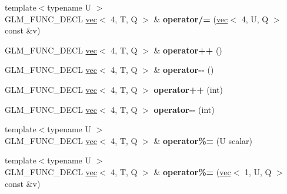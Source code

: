\begin{DoxyCompactItemize}
\item 
\mbox{\label{structglm_1_1vec_3_014_00_01T_00_01Q_01_4_aba90aef1a5d08c44f2ca6be9684bf1cd}} 
{\footnotesize template$<$typename U $>$ }\\G\+L\+M\+\_\+\+F\+U\+N\+C\+\_\+\+D\+E\+CL \hyperlink{structglm_1_1vec}{vec}$<$ 4, T, Q $>$ \& {\bfseries operator/=} (\hyperlink{structglm_1_1vec}{vec}$<$ 4, U, Q $>$ const \&v)
\item 
\mbox{\label{structglm_1_1vec_3_014_00_01T_00_01Q_01_4_a8729def59c3f8b14075332c8603dd5c7}} 
G\+L\+M\+\_\+\+F\+U\+N\+C\+\_\+\+D\+E\+CL \hyperlink{structglm_1_1vec}{vec}$<$ 4, T, Q $>$ \& {\bfseries operator++} ()
\item 
\mbox{\label{structglm_1_1vec_3_014_00_01T_00_01Q_01_4_a1aa18c4fcac90cabb4f8cb2e467d4d9f}} 
G\+L\+M\+\_\+\+F\+U\+N\+C\+\_\+\+D\+E\+CL \hyperlink{structglm_1_1vec}{vec}$<$ 4, T, Q $>$ \& {\bfseries operator-\/-\/} ()
\item 
\mbox{\label{structglm_1_1vec_3_014_00_01T_00_01Q_01_4_a622a107338ed3355458bf43b9e078b7b}} 
G\+L\+M\+\_\+\+F\+U\+N\+C\+\_\+\+D\+E\+CL \hyperlink{structglm_1_1vec}{vec}$<$ 4, T, Q $>$ {\bfseries operator++} (int)
\item 
\mbox{\label{structglm_1_1vec_3_014_00_01T_00_01Q_01_4_ae095dbcd5c299033774aef2f534e9a26}} 
G\+L\+M\+\_\+\+F\+U\+N\+C\+\_\+\+D\+E\+CL \hyperlink{structglm_1_1vec}{vec}$<$ 4, T, Q $>$ {\bfseries operator-\/-\/} (int)
\item 
\mbox{\label{structglm_1_1vec_3_014_00_01T_00_01Q_01_4_a4887bc32b7edf48fc28dcfaca51f4172}} 
{\footnotesize template$<$typename U $>$ }\\G\+L\+M\+\_\+\+F\+U\+N\+C\+\_\+\+D\+E\+CL \hyperlink{structglm_1_1vec}{vec}$<$ 4, T, Q $>$ \& {\bfseries operator\%=} (U scalar)
\item 
\mbox{\label{structglm_1_1vec_3_014_00_01T_00_01Q_01_4_af2437a9e70535d7ae0c01c7be439c209}} 
{\footnotesize template$<$typename U $>$ }\\G\+L\+M\+\_\+\+F\+U\+N\+C\+\_\+\+D\+E\+CL \hyperlink{structglm_1_1vec}{vec}$<$ 4, T, Q $>$ \& {\bfseries operator\%=} (\hyperlink{structglm_1_1vec}{vec}$<$ 1, U, Q $>$ const \&v)

\end{DoxyCompactItemize}
